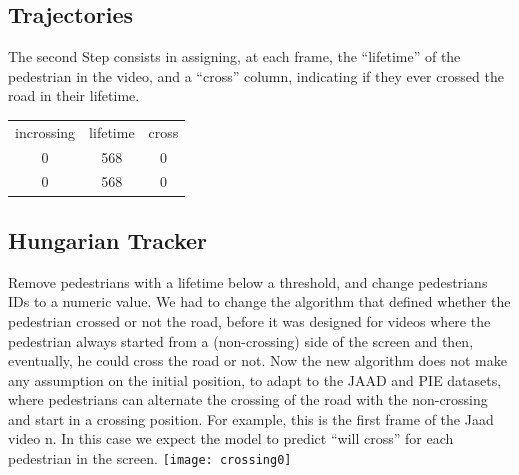 \documentclass[11pt]{article}
\begin{document}
\subsection*{Trajectories}
    The second Step consists in assigning, at each frame, the ``lifetime'' of the pedestrian in the video, and a ``cross'' column, indicating if they
    ever crossed the road in their lifetime.
    \begin{center}
    \begin{tabular}{ c c c}
     incrossing & lifetime & cross\\
     0 & 568 & 0\\
     0 & 568 & 0\\
    \end{tabular}
    \end{center}

\subsection*{Hungarian Tracker}
    Remove pedestrians with a lifetime below a threshold, and change pedestrians IDs to a numeric value.
    We had to change the algorithm that defined whether the pedestrian crossed or not the road, before it was designed for
    videos where the pedestrian always started from a (non-crossing) side of the screen and then, eventually, he could cross the road
    or not.
    Now the new algorithm does not make any assumption on the initial position, to adapt to the JAAD and PIE datasets, where
    pedestrians can alternate the crossing of the road with the non-crossing and start in a crossing position.
    For example, this is the first frame of the Jaad video n. In this case we expect the model to predict ``will cross''
    for each pedestrian in the screen.
    \texttt{[image: crossing0]}\\
\end{document}
